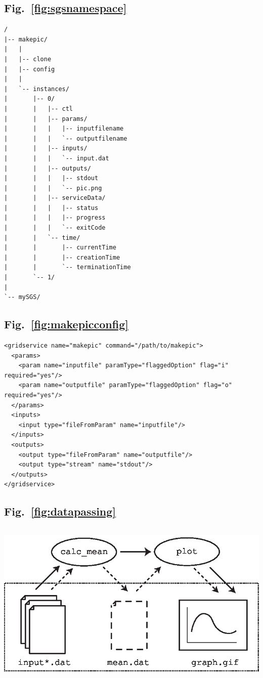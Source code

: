 \documentclass[a4paper]{article}
\begin{document}
\newpage

\subsection*{Fig.~\ref{fig:sgsnamespace}}
\begin{verbatim}
/
|-- makepic/
|   |
|   |-- clone
|   |-- config
|   |
|   `-- instances/
|       |-- 0/
|       |   |-- ctl
|       |   |-- params/
|       |   |   |-- inputfilename
|       |   |   `-- outputfilename
|       |   |-- inputs/
|       |   |   `-- input.dat
|       |   |-- outputs/
|       |   |   |-- stdout
|       |   |   `-- pic.png
|       |   |-- serviceData/
|       |   |   |-- status
|       |   |   |-- progress
|       |   |   `-- exitCode
|       |   `-- time/
|       |       |-- currentTime
|       |       |-- creationTime
|       |       `-- terminationTime
|       `-- 1/
|
`-- mySGS/
\end{verbatim}

\newpage

\subsection*{Fig.~\ref{fig:makepicconfig}}

\begin{verbatim}
<gridservice name="makepic" command="/path/to/makepic">
  <params>
    <param name="inputfile" paramType="flaggedOption" flag="i" required="yes"/>
    <param name="outputfile" paramType="flaggedOption" flag="o" required="yes"/>
  </params>
  <inputs>
    <input type="fileFromParam" name="inputfile"/>
  </inputs>
  <outputs>
    <output type="fileFromParam" name="outputfile"/>
    <output type="stream" name="stdout"/>
  </outputs>
</gridservice>
\end{verbatim}

\newpage

\subsection*{Fig.~\ref{fig:datapassing}}
\includegraphics[height=8cm]{datapassing.eps}
\end{document}
